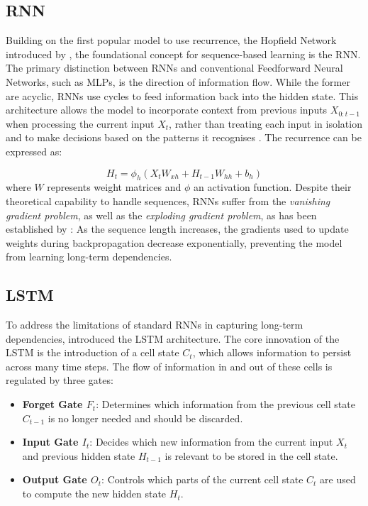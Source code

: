     \subsection{RNN}
    Building on the first popular model to use recurrence, the Hopfield Network introduced by \textcite{hopfieldrnn}, the foundational concept for sequence-based learning is the \acf{RNN}.  
    The primary distinction between \acp{RNN} and conventional Feedforward Neural Networks, such as \acp{MLP}, is the direction of information flow. While the former %
 are acyclic, \acp{RNN} use cycles to feed information back into the hidden state. %
 This architecture allows the model to incorporate context from previous inputs $X_{0:t-1}$ when processing the current input $X_t$, rather than treating each input in isolation \parencite{gentleschmidt2019recurrentneuralnetworksrnns} and to make decisions based on the patterns it recognises \parencite{AIBook}. The recurrence can be expressed as:

    \begin{equation*}
        H_t = \phi_h (X_t W_{xh} + H_{t-1} W_{hh} + b_h) %
    \end{equation*}
    where $W$ represents weight matrices and $\phi$ an activation function. Despite their theoretical capability to handle sequences, \acp{RNN} suffer from the \emph{vanishing gradient problem}, as well as the \emph{exploding gradient problem}, as has been established by \textcite{279181bengio}: As the sequence length increases, the gradients used to update weights during backpropagation decrease exponentially, preventing the model from learning long-term dependencies.
    
    \subsection{LSTM}

     To address the limitations of standard \acp{RNN} in capturing long-term dependencies, \textcite{hochreiterLSTM} introduced the \ac{LSTM} architecture. The core innovation of the \ac{LSTM} is the introduction of a cell state $C_t$, which allows information to persist across many time steps. The flow of information in and out of these cells is regulated by three gates:
    \begin{itemize}
        \item \textbf{Forget Gate $F_t$}:  Determines which information from the previous cell state $C_{t-1}$ is no longer needed and should be discarded.
        \item \textbf{Input Gate $I_t$}: Decides which new information from the current input $X_t$ and previous hidden state $H_{t-1}$ is relevant to be stored in the cell state.
        \item \textbf{Output Gate $O_t$}: Controls which parts of the current cell state $C_t$ are used to compute the new hidden state $H_t$.
    \end{itemize}
    
